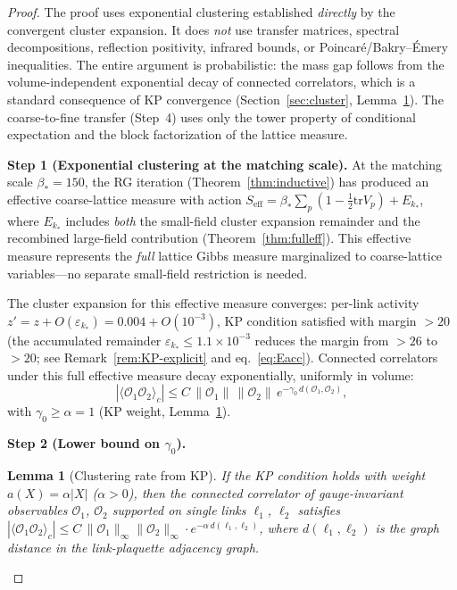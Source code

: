 \documentclass[11pt]{article}
\newtheorem{lemma}[theorem]{Lemma}
\theoremstyle{definition}
\newcommand{\tr}{\mathrm{tr}}
\begin{document}
\begin{proof}
The proof uses exponential clustering established \emph{directly}
by the convergent cluster expansion.  It does
\emph{not} use transfer matrices, spectral decompositions,
reflection positivity, infrared bounds, or Poincar\'e/Bakry--\'Emery
inequalities.  The entire argument
is probabilistic: the mass gap follows from the volume-independent
exponential decay of connected correlators, which is a standard
consequence of KP convergence
(Section~\ref{sec:cluster}, Lemma~\ref{lem:cluster-rate}).
The coarse-to-fine transfer
(Step~4) uses only the tower property of conditional expectation
and the block factorization of the lattice measure.

\medskip\noindent\textbf{Step 1 (Exponential clustering at the
matching scale).}
At the matching scale $\beta_*=150$, the RG iteration
(Theorem~\ref{thm:inductive}) has produced an effective
coarse-lattice measure with action
$S_{\mathrm{eff}}=\beta_*\sum_p(1-\frac{1}{2}\tr V_p)+E_{k_*}$,
where $E_{k_*}$ includes \emph{both} the small-field cluster
expansion remainder and the recombined large-field contribution
(Theorem~\ref{thm:fulleff}).  This effective measure represents
the \emph{full} lattice Gibbs measure marginalized to
coarse-lattice variables---no separate small-field restriction
is needed.

The cluster expansion for this effective measure converges:
per-link activity $z'=z+O(\varepsilon_{k_*})=0.004+O(10^{-3})$,
KP condition satisfied with margin $>20$
(the accumulated remainder $\varepsilon_{k_*}\le 1.1\times 10^{-3}$
reduces the margin from $>26$ to $>20$; see
Remark~\ref{rem:KP-explicit} and eq.~\eqref{eq:Eacc}).
Connected correlators under this full effective measure decay
exponentially, uniformly in volume:
\begin{equation}\label{eq:cluster-decay}
|\langle\mathcal{O}_1\mathcal{O}_2\rangle_c|
\le C\,\|\mathcal{O}_1\|\,\|\mathcal{O}_2\|\,
e^{-\gamma_0\,d(\mathcal{O}_1,\mathcal{O}_2)},
\end{equation}
with $\gamma_0\ge\alpha=1$ (KP weight,
Lemma~\ref{lem:cluster-rate}).

\medskip\noindent\textbf{Step 2 (Lower bound on $\gamma_0$).}

\begin{lemma}[Clustering rate from KP]\label{lem:cluster-rate}
If the KP condition holds with weight $a(X)=\alpha|X|$
($\alpha>0$), then the connected correlator of gauge-invariant
observables $\mathcal{O}_1$, $\mathcal{O}_2$ supported on
single links $\ell_1$, $\ell_2$ satisfies
$|\langle\mathcal{O}_1\mathcal{O}_2\rangle_c|
\le C\,\|\mathcal{O}_1\|_\infty\|\mathcal{O}_2\|_\infty
\cdot e^{-\alpha\,d(\ell_1,\ell_2)}$,
where $d(\ell_1,\ell_2)$ is the graph distance in the
link-plaquette adjacency graph.
\end{lemma}


\end{proof}
\end{document}
